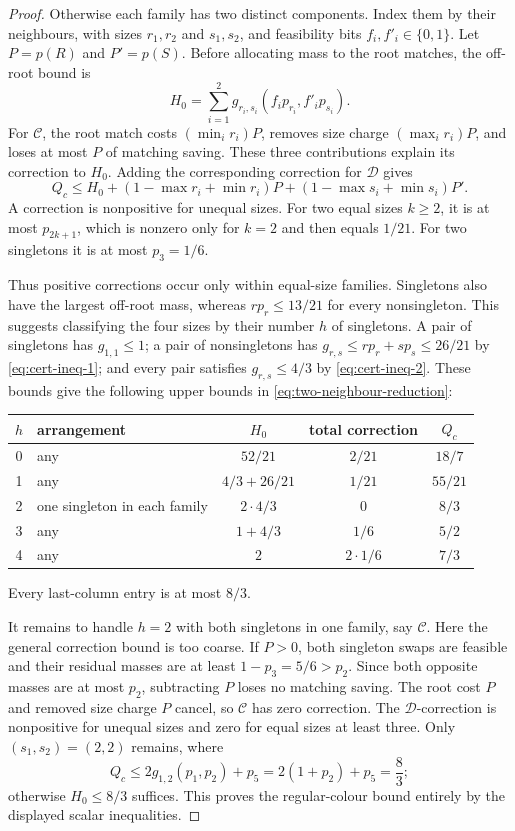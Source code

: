 \documentclass[11pt,reqno]{article}
\theoremstyle{plain}
\theoremstyle{definition}
\theoremstyle{remark}
\theoremstyle{definition}
\theoremstyle{remark}
\begin{document}
\begin{proof}
Otherwise each family has two distinct components.  Index them by their
neighbours, with sizes \(r_1,r_2\) and \(s_1,s_2\), and feasibility
bits \(f_i,f'_i\in\{0,1\}\).  Let \(P=p(R)\) and \(P'=p(S)\).  Before
allocating mass to the root matches, the off-root bound is
\[
  H_0=\sum_{i=1}^2 g_{r_i,s_i}(f_ip_{r_i},f'_ip_{s_i}).
\]
For \(\mathcal C\), the root match costs \((\min_i r_i)P\), removes
size charge \((\max_i r_i)P\), and loses at most \(P\) of matching
saving.  These three contributions explain its correction to \(H_0\).
Adding the corresponding correction for \(\mathcal D\) gives
\begin{equation}\label{eq:two-neighbour-reduction}
 Q_c\le H_0+(1-\max r_i+\min r_i)P
             +(1-\max s_i+\min s_i)P'.
\end{equation}
A correction is nonpositive for unequal sizes.  For two equal sizes
\(k\ge2\), it is at most \(p_{2k+1}\), which is nonzero only for
\(k=2\) and then equals \(1/21\).  For two singletons it is at most
\(p_3=1/6\).

Thus positive corrections occur only within equal-size families.
Singletons also have the largest off-root mass, whereas
\(rp_r\le13/21\) for every nonsingleton.  This suggests classifying
the four sizes by their number \(h\) of singletons.  A pair of
singletons has \(g_{1,1}\le1\); a pair of nonsingletons has
\(g_{r,s}\le rp_r+sp_s\le26/21\) by \eqref{eq:cert-ineq-1}; and every
pair satisfies \(g_{r,s}\le4/3\) by \eqref{eq:cert-ineq-2}.  These bounds
give the following upper bounds in \eqref{eq:two-neighbour-reduction}:
\begin{center}
\begin{tabular}{@{}clccc@{}}
\toprule
\(h\) & arrangement & \(H_0\) & total correction & \(Q_c\)\\
\midrule
0 & any & \(52/21\) & \(2/21\) & \(18/7\)\\
1 & any & \(4/3+26/21\) & \(1/21\) & \(55/21\)\\
2 & one singleton in each family & \(2\cdot4/3\) & \(0\) & \(8/3\)\\
3 & any & \(1+4/3\) & \(1/6\) & \(5/2\)\\
4 & any & \(2\) & \(2\cdot1/6\) & \(7/3\)\\
\bottomrule
\end{tabular}
\end{center}
Every last-column entry is at most \(8/3\).

It remains to handle \(h=2\) with both singletons in one family, say
\(\mathcal C\).  Here the general correction bound is too coarse.
If \(P>0\), both singleton swaps are feasible and their residual masses
are at least \(1-p_3=5/6>p_2\).  Since both opposite masses are at most
\(p_2\), subtracting \(P\) loses no matching saving.  The root cost
\(P\) and removed size charge \(P\) cancel, so \(\mathcal C\) has
zero correction.  The \(\mathcal D\)-correction is nonpositive for
unequal sizes and zero for equal sizes at least three.
Only \((s_1,s_2)=(2,2)\) remains, where
\[
  Q_c\le2g_{1,2}(p_1,p_2)+p_5
       =2(1+p_2)+p_5=\frac83;
\]
otherwise \(H_0\le8/3\) suffices.  This proves the regular-colour bound
entirely by the displayed scalar inequalities.


\end{proof}
\end{document}
